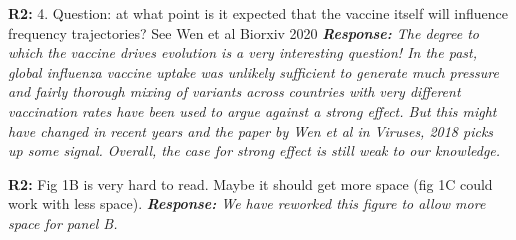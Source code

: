 \documentclass[aps,rmp,onecolumn]{revtex4-1}
\newcommand{\refb}[1]{\textbf{R2:} #1\vskip 5mm}
\newcommand{\response}[1]{{\it {\color{response}\textbf{Response:} #1}}\vskip 5mm}
\begin{document}
\refb{4. Question: at what point is it expected that the vaccine itself will influence frequency trajectories? See Wen et al Biorxiv 2020}
\response{
	The degree to which the vaccine drives evolution is a very interesting question!
	In the past, global influenza vaccine uptake was unlikely sufficient to generate much pressure and fairly thorough mixing of variants across countries with very different vaccination rates have been used to argue against a strong effect. But this might have changed in recent years and the paper by Wen et al in Viruses, 2018 picks up some signal.
	Overall, the case for strong effect is still weak to our knowledge.
}

\refb{Fig 1B is very hard to read. Maybe it should get more space (fig 1C could work with less space).}
\response{We have reworked this figure to allow more space for panel B.}
\end{document}

